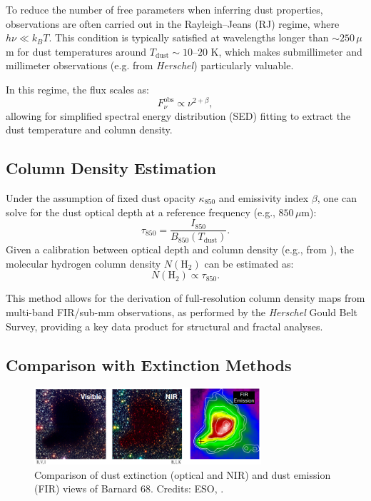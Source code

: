 To reduce the number of free parameters when inferring dust properties, observations are often carried out in the Rayleigh–Jeans (RJ) regime, where $h\nu \ll k_B T$. This condition is typically satisfied at wavelengths longer than $\sim 250\,\mu$m for dust temperatures around $T_\mathrm{dust} \sim 10$–$20$ K, which makes submillimeter and millimeter observations (e.g. from \textit{Herschel}) particularly valuable.

In this regime, the flux scales as:
\[
F_\nu^{\mathrm{obs}} \propto \nu^{2+\beta},
\]
allowing for simplified spectral energy distribution (SED) fitting to extract the dust temperature and column density.

\subsection{Column Density Estimation}

Under the assumption of fixed dust opacity $\kappa_{850}$ and emissivity index $\beta$, one can solve for the dust optical depth at a reference frequency (e.g., $850\,\mu$m):
\[
\tau_{850} = \frac{I_{850}}{B_{850}(T_\mathrm{dust})}.
\]
Given a calibration between optical depth and column density (e.g., from \cite{hildebrand1983determination}), the molecular hydrogen column density $N(\mathrm{H}_2)$ can be estimated as:
\[
N(\mathrm{H}_2) \propto \tau_{850}.
\]

This method allows for the derivation of full-resolution column density maps from multi-band FIR/sub-mm observations, as performed by the \textit{Herschel} Gould Belt Survey, providing a key data product for structural and fractal analyses.

\subsection{Comparison with Extinction Methods}

\begin{figure}[t]
    \centering
    \includegraphics[width=0.75\textwidth]{figures/comparison_dust.png}
    \caption{Comparison of dust extinction (optical and NIR) and dust emission (FIR) views of Barnard 68. Credits: ESO, \cite{nielbock2012earliest}.}
    \label{fig:comparison_dust}
\end{figure}

